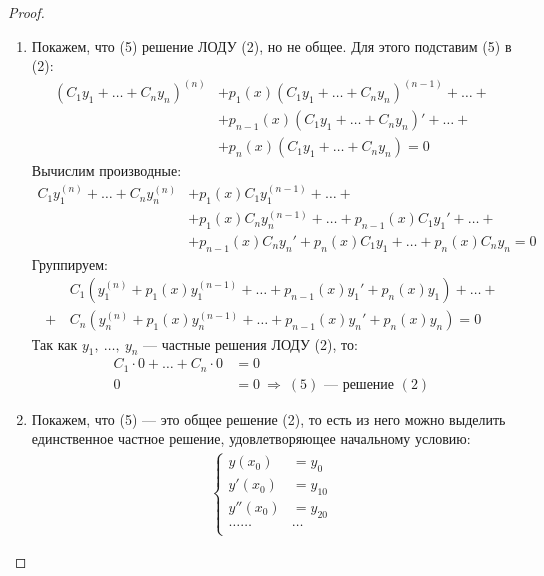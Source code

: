 \begin{proof}\,
    \begin{enumerate}
        \item Покажем, что (5) решение ЛОДУ (2), но не общее. Для этого подставим (5) в (2):
        \begin{align*}
            \left(C_1y_1 + \ldots + C_ny_n\right)^{(n)} & + p_1(x) \left(C_1y_1 + \ldots + C_ny_n\right)^{(n-1)} + \ldots + \\
            & + p_{n-1}(x) \left(C_1y_1 + \ldots + C_ny_n\right)' + \ldots + \\
            & + p_n(x) \left(C_1y_1 + \ldots + C_ny_n\right) = 0
        \end{align*}
        Вычислим производные:
        \begin{align*}
            C_1y_1^{(n)} + \ldots + C_ny_n^{(n)} & + p_1(x) C_1y_1^{(n-1)} + \ldots + \\ 
            & + p_1(x)C_ny_n^{(n-1)} + \ldots + p_{n-1}(x) C_1y_1' + \ldots + \\
            & + p_{n-1}(x)C_ny_n' + p_{n}(x) C_1y_1 + \ldots + p_{n}(x)C_ny_n = 0
        \end{align*}
        Группируем:
        \begin{align*}
            & C_1\left(y_1^{(n)} + p_1(x)y_1^{(n-1)} + \ldots + p_{n-1}(x)y_1' + p_n(x) y_1\right) + \ldots + \\
            +\, & C_n\left(y_n^{(n)} + p_1(x)y_n^{(n-1)} + \ldots + p_{n-1}(x)y_n' + p_n(x) y_n\right) = 0
        \end{align*}
        Так как $y_1,\ \ldots,\ y_n$ --- частные решения ЛОДУ (2), то:
        \begin{align*}
            C_1\cdot 0 + \ldots + C_n \cdot 0 &= 0 \\
            0 &= 0\ \Rightarrow\ (5)\text{ --- решение } (2)
        \end{align*}
        \item Покажем, что (5) --- это общее решение (2), то есть из него можно выделить единственное частное решение, удовлетворяющее начальному условию:
        \begin{gather}
            \left\{ \begin{aligned}
                y(x_0) &= y_0 \\
                y'(x_0) &= y_{10}\\
                y''(x_0) &= y_{20} \\
                \ldots\ldots&\ldots \\

\end{aligned}
\end{gather}
\end{enumerate}
\end{proof}
